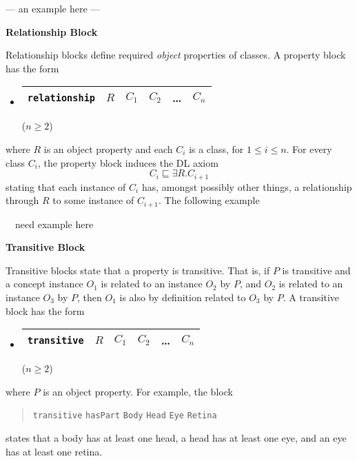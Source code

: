 \documentclass[preprint,number]{elsarticle}
\newcommand{\mypara}[1]{\vspace{12pt}\noindent\textbf{#1}}
\begin{document}
--- an example here ---


\mypara{Relationship Block}

\mypara{}Relationship blocks define required \emph{object} properties
of classes. A property block has the form
\begin{itemize}
\item[]
  \begin{tabular}{|l|l|l|l|l|l|}\hline \texttt{relationship} & $R$ & $C_1$
    & $C_2$ & \dots & $C_n$ \\ \hline
  \end{tabular} \hfill ($n \ge 2$)
\end{itemize}
where $R$ is an object property and each $C_i$ is a class, for $1 \le
i \le n$.  For every class $C_i$, the property block induces the DL
axiom \[C_i \sqsubseteq \exists R . C_{i+1} \] stating that each
instance of $C_i$ has, amongst possibly other things, a relationship
through $R$ to some instance of $C_{i+1}$.  The following example
\begin{tabbing}
   ~~need example here
\end{tabbing}

\mypara{Transitive Block} 

\mypara{}Transitive blocks state that a property is transitive. That
is, if $P$ is transitive and a concept instance $O_1$ is related to an
instance $O_2$ by $P$, and $O_2$ is related to an instance $O_3$ by
$P$, then $O_1$ is also by definition related to $O_3$ by $P$. A
transitive block has the form
\begin{itemize}
\item[]
  \begin{tabular}{|l|l|l|l|l|l|}\hline \texttt{transitive} & $R$ & $C_1$
    & $C_2$ & \dots & $C_n$ \\ \hline
  \end{tabular} \hfill ($n \ge 2$)
\end{itemize}
where $P$ is an object property. For example, the block
\begin{quote}\texttt{transitive} \texttt{hasPart} \texttt{Body}
  \texttt{Head} \texttt{Eye} \texttt{Retina}
\end{quote} states that a body has at least one head, a head has at
least one eye, and an eye has at least one retina.
\end{document}
